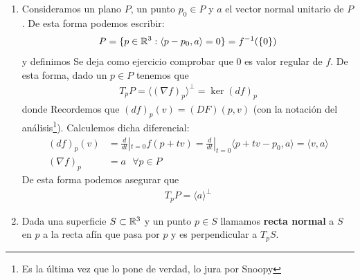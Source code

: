 \begin{ejemplo}
\begin{enumerate}
        \begin{enumerate}
            \item Consideramos un plano $P$, un punto $p_0\in P$ y $a$ el vector normal unitario de $P$. De esta forma podemos escribir:
            \begin{gather*}
                P = \{p\in \mathbb{R}^3 : \langle p - p_0, a\rangle = 0\} = f^{-1}(\{0\})
            \end{gather*}
            y definimos 
            Se deja como ejercicio comprobar que $0$ es valor regular de $f$.
            De esta forma, dado un $p\in P$ tenemos que 
            \begin{gather*}
                T_pP = \langle (\nabla f)_p \rangle^{\bot} = \ker(df)_p
            \end{gather*}
            donde
            Recordemos que $(df)_p(v)=(DF)(p,v)$ (con la notación del análisis\footnote{Es la última vez que lo pone de verdad, lo jura por Snoopy}). Calculemos dicha diferencial:
            \begin{align*}
                (df)_p(v)&= \frac{d}{dt}|_{t=0} f(p+tv) = \frac{d}{dt}|_{t=0} \langle p + tv - p_0, a \rangle = \langle v,a \rangle\\
                (\nabla f)_p &= a \ \ \ \forall p \in P
            \end{align*}
            De esta forma podemos asegurar que 
            \begin{gather*}
                T_pP = \langle a \rangle^{\bot}
            \end{gather*}

            \item \begin{definicion}
                Dada una superficie $S\subset \mathbb{R}^3$ y un punto $p\in S$ llamamos \textbf{recta normal} a $S$ en $p$ a la recta afín que pasa por $p$ y es perpendicular a $T_pS$.
            \end{definicion}


\end{enumerate}
\end{enumerate}
\end{ejemplo}
